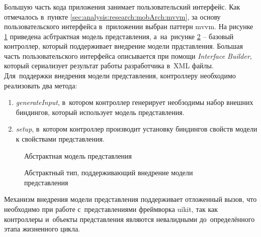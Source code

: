 \subsubsection{}
\label{sec:development:client:vc}

Большую часть кода приложения занимает пользовательский интерфейс. Как отмечалось в~пункте \ref{sec:analysis:research:mobArch:mvvm}, за основу пользовательского интерфейса в~приложении выбран паттерн \gls{mvvm}. 
На рисунке \ref{sec:development:client:vc:code:vm} приведена асбтрактная модель представления, а~на~рисунке \ref{sec:development:client:vc:code:vc} -- базовый контроллер, который поддерживает внедрение модели прдставления. Большая часть пользовательского интерфейса описывается при помощи \textit{Interface Builder}, который сериализует результат работы разработчика в~XML файлы. Для~поддержки внедрения модели представления, контроллеру необходимо реализовать два метода: 
\begin{enumerate}
	\item \textit{generateInput}, в~котором контроллер генерирует необзодимы набор внешних биндингов, который использует модель представления.
	\item \textit{setup}, в~котором контроллер производит установку биндингов свойств модели к свойствами представления.
\end{enumerate}

\begin{figure}[h]
	
   \caption{Абстрактная модель представления}
   \label{sec:development:client:vc:code:vm}
\end{figure}

\begin{figure}[h]
	
   \caption{Абстрактный тип, поддерживающий внедрение модели представления}
   \label{sec:development:client:vc:code:vc}
\end{figure}

Механизм внедрения модели представления поддерживает отложенный вызов, что необходимо при работе с~представлениями фреймворка \gls{uikit}, так как контроллеры и~объекты представления являются невалидными до~определённого этапа жизненного цикла.